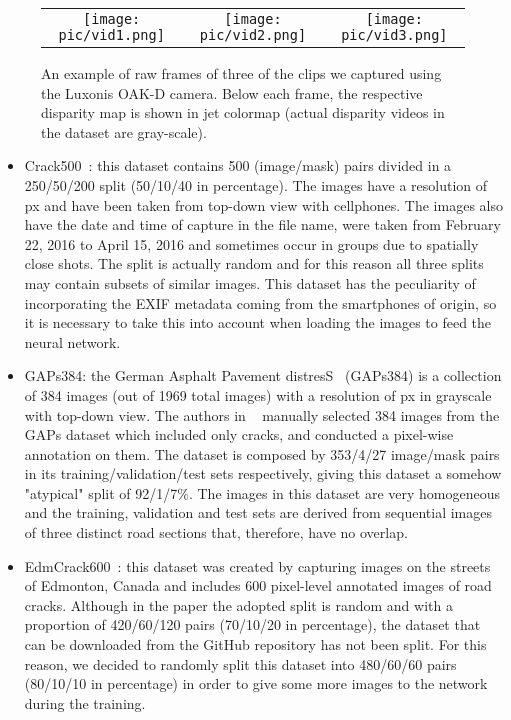\documentclass[twocolumn]{article}
\begin{document}
\begin{figure}
    \centering
    \setlength{\tabcolsep}{0pt}
    \begin{tabular}{ccc}
        \texttt{[image: pic/vid1.png]} &
        \texttt{[image: pic/vid2.png]} &
        \texttt{[image: pic/vid3.png]}
    \end{tabular}
    \caption{An example of raw frames of three of the clips we captured using the Luxonis OAK-D camera. Below each frame, the respective disparity map is shown in jet colormap (actual disparity videos in the dataset are gray-scale).}
    \label{fig:video_sample}
\end{figure}

\begin{itemize}
    \item Crack500~\cite{crack500_1,crack500_2}: this dataset contains 500 (image/mask) pairs divided in a 250/50/200 split (50/10/40 in percentage). The images have a resolution of  px and have been taken from top-down view with cellphones. The images also have the date and time of capture in the file name, were taken from February 22, 2016 to April 15, 2016 and sometimes occur in groups due to spatially close shots. The split is actually random and for this reason all three splits may contain subsets of similar images. This dataset has the peculiarity of incorporating the EXIF metadata coming from the smartphones of origin, so it is necessary to take this into account when loading the images to feed the neural network.
    \item GAPs384: the German Asphalt Pavement distresS~\cite{GAPs384_2} (GAPs384) is a collection of 384 images (out of 1969 total images) with a resolution of  px in grayscale with top-down view. The authors in ~\cite{crack500_2} manually selected 384 images from the GAPs dataset which included only cracks, and conducted a pixel-wise annotation on them. The dataset is composed by 353/4/27 image/mask pairs in its training/validation/test sets respectively, giving this dataset a somehow "atypical" split of 92/1/7\%. The images in this dataset are very homogeneous and the training, validation and test sets are derived from sequential images of three distinct road sections that, therefore, have no overlap.
    \item EdmCrack600~\cite{EdmCrack600_1,EdmCrack600_2,EdmCrack600_3}: this dataset was created by capturing images on the streets of Edmonton, Canada and includes 600 pixel-level annotated images of road cracks. Although in the paper the adopted split is random and with a proportion of 420/60/120 pairs (70/10/20 in percentage), the dataset that can be downloaded from the GitHub repository has not been split. For this reason, we decided to randomly split this dataset into 480/60/60 pairs (80/10/10 in percentage) in order to give some more images to the network during the training.

\end{itemize}
\end{document}
